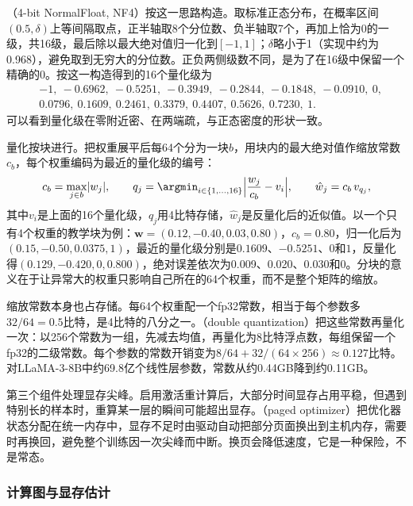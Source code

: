 （4-bit NormalFloat, NF4）按这一思路构造。取标准正态分布，在概率区间$(0.5,\delta)$上等间隔取点，正半轴取8个分位数、负半轴取7个，再加上恰为0的一级，共16级，最后除以最大绝对值归一化到$[-1,1]$；$\delta$略小于1（实现中约为0.968），避免取到无穷大的分位数。正负两侧级数不同，是为了在16级中保留一个精确的0。按这一构造得到的16个量化级为
\[
\begin{aligned}
 &-1,\ -0.6962,\ -0.5251,\ -0.3949,\ -0.2844,\ -0.1848,\ -0.0910,\ 0,\\
 &0.0796,\ 0.1609,\ 0.2461,\ 0.3379,\ 0.4407,\ 0.5626,\ 0.7230,\ 1.
\end{aligned}
\]
可以看到量化级在零附近密、在两端疏，与正态密度的形状一致。

量化按块进行。把权重展平后每64个分为一块$b$，用块内的最大绝对值作缩放常数$c_b$，每个权重编码为最近的量化级的编号：
\begin{equation}
 c_b=\max_{j\in b}\lvert w_j\rvert,\qquad
 q_j=\argmin_{i\in\{1,\ldots,16\}}\Bigl\lvert\frac{w_j}{c_b}-v_i\Bigr\rvert,\qquad
 \hat w_j=c_b\,v_{q_j},
 \label{eq:nlp-sft-nf4-quant}
\end{equation}
其中$v_i$是上面的16个量化级，$q_j$用4比特存储，$\hat w_j$是反量化后的近似值。以一个只有4个权重的教学块为例：$\bm w=(0.12,-0.40,0.03,0.80)$，$c_b=0.80$，归一化后为$(0.15,-0.50,0.0375,1)$，最近的量化级分别是$0.1609$、$-0.5251$、$0$和$1$，反量化得$(0.129,-0.420,0,0.800)$，绝对误差依次为0.009、0.020、0.030和0。分块的意义在于让异常大的权重只影响自己所在的64个权重，而不是整个矩阵的缩放。

缩放常数本身也占存储。每64个权重配一个fp32常数，相当于每个参数多$32/64=0.5$比特，是4比特的八分之一。（double quantization）把这些常数再量化一次：以256个常数为一组，先减去均值，再量化为8比特浮点数，每组保留一个fp32的二级常数。每个参数的常数开销变为$8/64+32/(64\times256)\approx0.127$比特。对LLaMA-3-8B中约69.8亿个线性层参数，常数从约0.44GB降到约0.11GB。

第三个组件处理显存尖峰。启用激活重计算后，大部分时间显存占用平稳，但遇到特别长的样本时，重算某一层的瞬间可能超出显存。（paged optimizer）把优化器状态分配在统一内存中，显存不足时由驱动自动把部分页面换出到主机内存，需要时再换回，避免整个训练因一次尖峰而中断。换页会降低速度，它是一种保险，不是常态。

\subsubsection{计算图与显存估计}
\label{sec:nlp-sft-qlora-memory}

